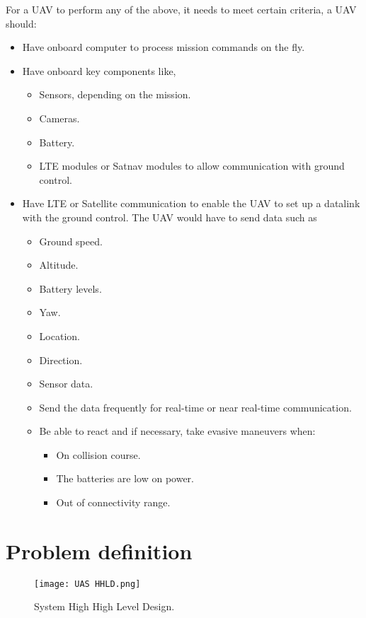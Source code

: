 For a UAV to perform any of the above, it needs to meet certain criteria, a UAV should:
\begin{itemize}
    \item Have onboard computer to process mission commands on the fly.
    \item Have onboard key components like,
          \begin{itemize}
              \item Sensors, depending on the mission.
              \item Cameras.
              \item Battery.
              \item LTE modules or Satnav modules to allow communication with ground control.
          \end{itemize}
    \item Have LTE or Satellite communication to enable the UAV to set up a datalink with the ground control. The UAV would have to send data such as
          \begin{itemize}
              \item	Ground speed.
              \item	Altitude.
              \item	Battery levels.
              \item	Yaw.
              \item	Location.
              \item	Direction.
              \item	Sensor data.
              \item	Send the data frequently for real-time or near real-time communication.
              \item	Be able to react and if necessary, take evasive maneuvers when:
                    \begin{itemize}
                        \item On collision course.
                        \item The batteries are low on power.
                        \item Out of connectivity range.
                    \end{itemize}
          \end{itemize}
\end{itemize}


\section{Problem definition}

\begin{figure}[!h]
    \label{fig:uas-hhld}
    \centering \texttt{[image: UAS HHLD.png]}
    \caption{System High High Level Design.}
\end{figure}

